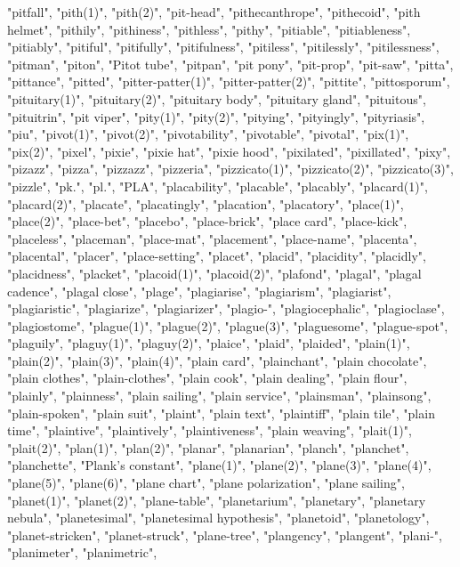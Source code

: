 "pitfall",
"pith(1)",
"pith(2)",
"pit-head",
"pithecanthrope",
"pithecoid",
"pith helmet",
"pithily",
"pithiness",
"pithless",
"pithy",
"pitiable",
"pitiableness",
"pitiably",
"pitiful",
"pitifully",
"pitifulness",
"pitiless",
"pitilessly",
"pitilessness",
"pitman",
"piton",
"Pitot tube",
"pitpan",
"pit pony",
"pit-prop",
"pit-saw",
"pitta",
"pittance",
"pitted",
"pitter-patter(1)",
"pitter-patter(2)",
"pittite",
"pittosporum",
"pituitary(1)",
"pituitary(2)",
"pituitary body",
"pituitary gland",
"pituitous",
"pituitrin",
"pit viper",
"pity(1)",
"pity(2)",
"pitying",
"pityingly",
"pityriasis",
"piu",
"pivot(1)",
"pivot(2)",
"pivotability",
"pivotable",
"pivotal",
"pix(1)",
"pix(2)",
"pixel",
"pixie",
"pixie hat",
"pixie hood",
"pixilated",
"pixillated",
"pixy",
"pizazz",
"pizza",
"pizzazz",
"pizzeria",
"pizzicato(1)",
"pizzicato(2)",
"pizzicato(3)",
"pizzle",
"pk.",
"pl.",
"PLA",
"placability",
"placable",
"placably",
"placard(1)",
"placard(2)",
"placate",
"placatingly",
"placation",
"placatory",
"place(1)",
"place(2)",
"place-bet",
"placebo",
"place-brick",
"place card",
"place-kick",
"placeless",
"placeman",
"place-mat",
"placement",
"place-name",
"placenta",
"placental",
"placer",
"place-setting",
"placet",
"placid",
"placidity",
"placidly",
"placidness",
"placket",
"placoid(1)",
"placoid(2)",
"plafond",
"plagal",
"plagal cadence",
"plagal close",
"plage",
"plagiarise",
"plagiarism",
"plagiarist",
"plagiaristic",
"plagiarize",
"plagiarizer",
"plagio-",
"plagiocephalic",
"plagioclase",
"plagiostome",
"plague(1)",
"plague(2)",
"plague(3)",
"plaguesome",
"plague-spot",
"plaguily",
"plaguy(1)",
"plaguy(2)",
"plaice",
"plaid",
"plaided",
"plain(1)",
"plain(2)",
"plain(3)",
"plain(4)",
"plain card",
"plainchant",
"plain chocolate",
"plain clothes",
"plain-clothes",
"plain cook",
"plain dealing",
"plain flour",
"plainly",
"plainness",
"plain sailing",
"plain service",
"plainsman",
"plainsong",
"plain-spoken",
"plain suit",
"plaint",
"plain text",
"plaintiff",
"plain tile",
"plain time",
"plaintive",
"plaintively",
"plaintiveness",
"plain weaving",
"plait(1)",
"plait(2)",
"plan(1)",
"plan(2)",
"planar",
"planarian",
"planch",
"planchet",
"planchette",
"Plank's constant",
"plane(1)",
"plane(2)",
"plane(3)",
"plane(4)",
"plane(5)",
"plane(6)",
"plane chart",
"plane polarization",
"plane sailing",
"planet(1)",
"planet(2)",
"plane-table",
"planetarium",
"planetary",
"planetary nebula",
"planetesimal",
"planetesimal hypothesis",
"planetoid",
"planetology",
"planet-stricken",
"planet-struck",
"plane-tree",
"plangency",
"plangent",
"plani-",
"planimeter",
"planimetric",
